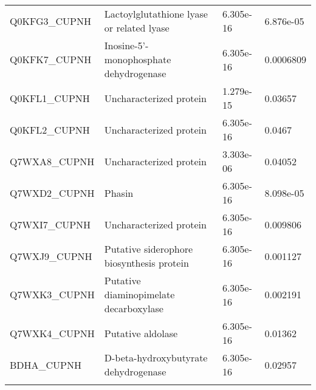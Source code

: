 \begin{center}
\begin{longtable}{ l l l l }
Q0KFG3\_CUPNH & Lactoylglutathione lyase or related lyase& 6.305e-16 & 6.876e-05 \\ [0.5ex]
Q0KFK7\_CUPNH & Inosine-5'-monophosphate dehydrogenase& 6.305e-16 & 0.0006809 \\ [0.5ex]
Q0KFL1\_CUPNH & Uncharacterized protein& 1.279e-15 & 0.03657 \\ [0.5ex]
Q0KFL2\_CUPNH & Uncharacterized protein& 6.305e-16 & 0.0467 \\ [0.5ex]
Q7WXA8\_CUPNH & Uncharacterized protein& 3.303e-06 & 0.04052 \\ [0.5ex]
Q7WXD2\_CUPNH & Phasin& 6.305e-16 & 8.098e-05 \\ [0.5ex]
Q7WXI7\_CUPNH & Uncharacterized protein& 6.305e-16 & 0.009806 \\ [0.5ex]
Q7WXJ9\_CUPNH & Putative siderophore biosynthesis protein& 6.305e-16 & 0.001127 \\ [0.5ex]
Q7WXK3\_CUPNH & Putative diaminopimelate decarboxylase& 6.305e-16 & 0.002191 \\ [0.5ex]
Q7WXK4\_CUPNH & Putative aldolase& 6.305e-16 & 0.01362 \\ [0.5ex]
BDHA\_CUPNH & D-beta-hydroxybutyrate dehydrogenase& 6.305e-16 & 0.02957 \\ [0.5ex] \bottomrule
\label{table:ralstonia-proteins}
\end{longtable}
\end{center}
